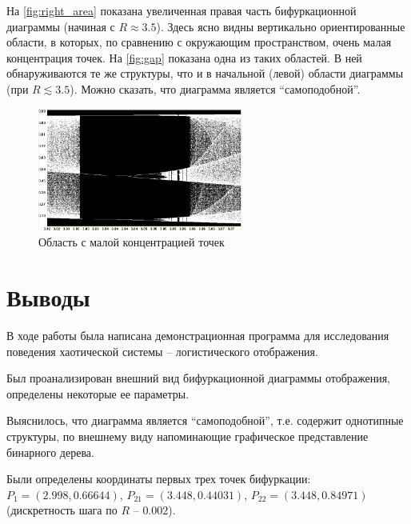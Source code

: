 \documentclass[12pt,a4paper]{article}
\begin{document}
На \autoref{fig:right_area} показана увеличенная правая часть бифуркационной диаграммы (начиная с $R \approx 3.5$). Здесь ясно видны вертикально ориентированные области, в которых, по сравнению с окружающим пространством, очень малая концентрация точек. На \autoref{fig:gap} показана одна из таких областей. В ней обнаруживаются те же структуры, что и в начальной (левой) области диаграммы (при $R \lesssim 3.5$). Можно сказать, что диаграмма является \enquote{самоподобной}.

\begin{figure}[h]%
\centering
\includegraphics[width=0.6\textwidth]{gap}%
\caption[Область с малой концентрацией точек.]{Область с малой концентрацией точек}%
\label{fig:gap}%
\end{figure}

\section{Выводы}

В ходе работы была написана демонстрационная программа для исследования поведения хаотической системы -- логистического отображения.

Был проанализирован внешний вид бифуркационной диаграммы отображения, определены некоторые ее параметры.

Выяснилось, что диаграмма является \enquote{самоподобной}, т.е. содержит однотипные структуры, по внешнему виду напоминающие графическое представление бинарного дерева.

Были определены координаты первых трех точек бифуркации: $P_1 = \left(2.998, 0.66644\right)$, $P_{21} = \left(3.448, 0.44031\right)$, $P_{22} = \left(3.448, 0.84971\right)$ (дискретность шага по $R$ -- $0.002$).
\end{document}
